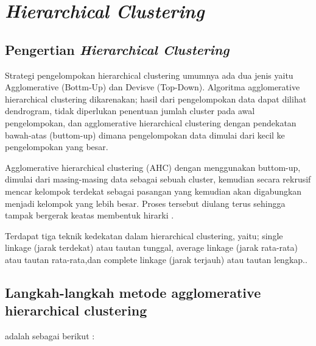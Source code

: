 \section{\textit{Hierarchical Clustering}}
\subsection{Pengertian \textit{Hierarchical Clustering}}
\hspace{1cm}Strategi pengelompokan hierarchical clustering umumnya ada dua jenis yaitu Agglomerative (Bottm-Up) dan Devisve (Top-Down). Algoritma agglomerative hierarchical clustering dikarenakan; hasil dari pengelompokan data dapat dilihat dendrogram, tidak diperlukan penentuan jumlah cluster pada awal pengelompokan, dan agglomerative hierarchical clustering dengan pendekatan bawah-atas (buttom-up) dimana pengelompokan data dimulai dari kecil ke pengelompokan yang besar. 
\par\hspace{0.5cm}Agglomerative hierarchical clustering (AHC) dengan menggunakan buttom-up, dimulai dari masing-masing data sebagai sebuah cluster, kemudian secara rekrusif mencar kelompok terdekat sebagai pasangan yang kemudian akan digabungkan menjadi kelompok yang lebih besar. Proses tersebut diulang terus sehingga tampak bergerak keatas membentuk hirarki .
\par\hspace{1cm}Terdapat tiga teknik kedekatan dalam hierarchical clustering, yaitu; single linkage (jarak terdekat) atau tautan tunggal, average linkage (jarak rata-rata) atau tautan rata-rata,dan complete linkage (jarak terjauh) atau tautan lengkap.\citep*{pujakusuma2017pengelompokan}.

\subsection{Langkah-langkah metode agglomerative hierarchical
clustering}
adalah sebagai berikut \citep*{alpiana2019penerapan} :

